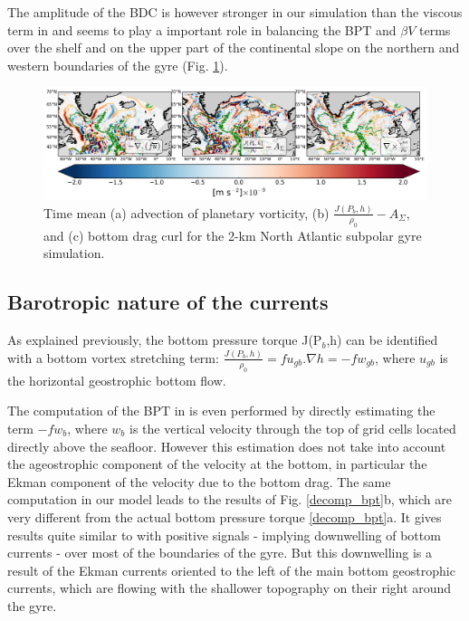 \documentclass[11pt,a4paper]{article}
\begin{document}
The amplitude of the BDC is however stronger in our simulation than the viscous term in \citet{yeager2015} and seems to play a important role in balancing the BPT and $\beta V$ terms over the shelf and on the upper part of the continental slope on the northern and western boundaries of the gyre (Fig. \ref{BDC}).

\begin{figure}[H]
\centerline{\includegraphics[width=20cm]{./v_b/BV_terms_test.png}}
\caption{Time mean (a) advection of planetary vorticity, (b) $\frac{J(P_b,h)}{\rho _0}-A_{\Sigma}$, and (c) bottom drag curl for the 2-km North Atlantic subpolar gyre simulation.}
\label{BDC}
\end{figure} 


\subsection{Barotropic nature of the currents}

As explained previously, the bottom pressure torque J(P$_b$,h) can be identified with a bottom vortex stretching term: $\frac{J(P_b,h)}{\rho _0}=f u_{gb}.\nabla h = -f w_{gb}$, where $u_{gb}$ is the horizontal geostrophic bottom flow. 

The computation of the BPT in \citet{spence2012} is even performed by directly estimating the term  $-f w_{b}$, where $w_{b}$ is the vertical velocity through the top of grid cells located directly above the seafloor. However this estimation does not take into account the ageostrophic component of the velocity at the bottom, in particular the Ekman component of the velocity due to the bottom drag. The same computation in our model leads to the results of Fig. \ref{decomp_bpt}b, which are very different from the actual bottom pressure torque \ref{decomp_bpt}a. It gives results quite similar to \citet{spence2012} with positive signals - implying downwelling of bottom currents - over most of the boundaries of the gyre. But this downwelling is a result of the Ekman currents oriented to the left of the main bottom geostrophic currents, which are flowing with the shallower topography on their right around the gyre.
\end{document}
